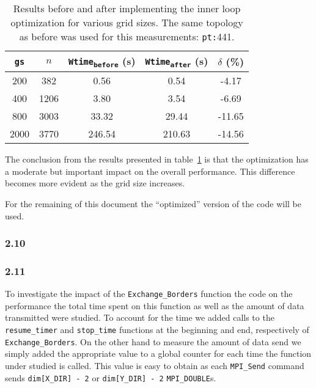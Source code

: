 \begin{table}[H] 
\centering
\begin{tabular}{*{5}{c}}
 \toprule
\texttt{gs}  &  $n$   &  \texttt{Wtime\textsubscript{before}} (\si{s})  &  \texttt{Wtime\textsubscript{after}} (\si{s})  & $\delta$ (\%) \\ \midrule
200          &   382  &  0.56                                           &  0.54                                          &  -4.17        \\
400          &  1206  &  3.80                                           &  3.54                                          &  -6.69        \\
800          &  3003  &  33.32                                          &  29.44                                         &  -11.65       \\
2000         &  3770  &  246.54                                         &  210.63                                        &  -14.56       \\
\bottomrule
\end{tabular}
\caption{Results before and after implementing the inner loop optimization for various grid sizes.
The same topology as before was used for this measurements: \texttt{pt:}441.}
\label{tbl:optimization}
\end{table}

The conclusion from the results presented in table~\ref{tbl:optimization} is that the optimization has a moderate but important impact on the overall performance. This difference becomes more evident as the grid size increases.

For the remaining of this document the ``optimized'' version of the code will be used.

\subsubsection{2.10}
\subsubsection{2.11}

To investigate the impact of the \texttt{Exchange\_Borders} function the code on the performance the total time spent on this function as well as the amount of data transmitted were studied.
To account for the time we added calls to the \texttt{resume\_timer} and \texttt{stop\_time} functions at the beginning and end, respectively of \texttt{Exchange\_Borders}.
On the other hand to measure the amount of data send we simply added the appropriate value to a global counter for each time the function under studied is called. This value is easy to obtain as each \texttt{MPI\_Send} command sends \texttt{dim[X\_DIR] - 2} or \texttt{dim[Y\_DIR] - 2} \texttt{MPI\_DOUBLE}s.


